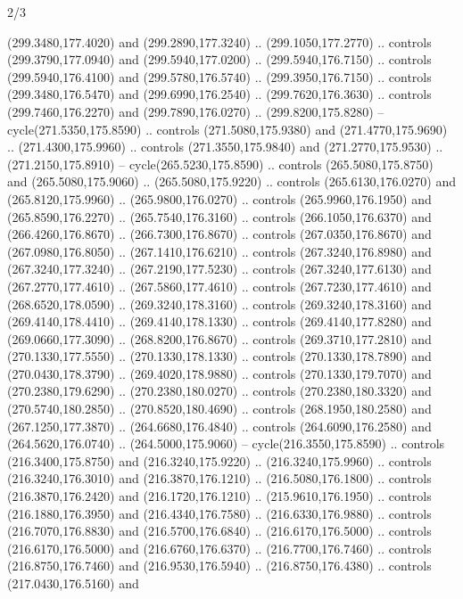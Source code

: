 \begin{flagdescription}{2/3}
\begin{scope}[xshift=0.5\flaglength,yshift=0.5\flagwidth,scale=\flagwidth/259.2]
\begin{scope}[y=0.8pt, x=0.8pt, yscale=-1,shift={(-243,-162)}]
      (299.3480,177.4020) and (299.2890,177.3240) .. (299.1050,177.2770) .. controls
      (299.3790,177.0940) and (299.5940,177.0200) .. (299.5940,176.7150) .. controls
      (299.5940,176.4100) and (299.5780,176.5740) .. (299.3950,176.7150) .. controls
      (299.3480,176.5470) and (299.6990,176.2540) .. (299.7620,176.3630) .. controls
      (299.7460,176.2270) and (299.7890,176.0270) .. (299.8200,175.8280) --
      cycle(271.5350,175.8590) .. controls (271.5080,175.9380) and
      (271.4770,175.9690) .. (271.4300,175.9960) .. controls (271.3550,175.9840) and
      (271.2770,175.9530) .. (271.2150,175.8910) -- cycle(265.5230,175.8590) ..
      controls (265.5080,175.8750) and (265.5080,175.9060) .. (265.5080,175.9220) ..
      controls (265.6130,176.0270) and (265.8120,175.9960) .. (265.9800,176.0270) ..
      controls (265.9960,176.1950) and (265.8590,176.2270) .. (265.7540,176.3160) ..
      controls (266.1050,176.6370) and (266.4260,176.8670) .. (266.7300,176.8670) ..
      controls (267.0350,176.8670) and (267.0980,176.8050) .. (267.1410,176.6210) ..
      controls (267.3240,176.8980) and (267.3240,177.3240) .. (267.2190,177.5230) ..
      controls (267.3240,177.6130) and (267.2770,177.4610) .. (267.5860,177.4610) ..
      controls (267.7230,177.4610) and (268.6520,178.0590) .. (269.3240,178.3160) ..
      controls (269.3240,178.3160) and (269.4140,178.4410) .. (269.4140,178.1330) ..
      controls (269.4140,177.8280) and (269.0660,177.3090) .. (268.8200,176.8670) ..
      controls (269.3710,177.2810) and (270.1330,177.5550) .. (270.1330,178.1330) ..
      controls (270.1330,178.7890) and (270.0430,178.3790) .. (269.4020,178.9880) ..
      controls (270.1330,179.7070) and (270.2380,179.6290) .. (270.2380,180.0270) ..
      controls (270.2380,180.3320) and (270.5740,180.2850) .. (270.8520,180.4690) ..
      controls (268.1950,180.2580) and (267.1250,177.3870) .. (264.6680,176.4840) ..
      controls (264.6090,176.2580) and (264.5620,176.0740) .. (264.5000,175.9060) --
      cycle(216.3550,175.8590) .. controls (216.3400,175.8750) and
      (216.3240,175.9220) .. (216.3240,175.9960) .. controls (216.3240,176.3010) and
      (216.3870,176.1210) .. (216.5080,176.1800) .. controls (216.3870,176.2420) and
      (216.1720,176.1210) .. (215.9610,176.1950) .. controls (216.1880,176.3950) and
      (216.4340,176.7580) .. (216.6330,176.9880) .. controls (216.7070,176.8830) and
      (216.5700,176.6840) .. (216.6170,176.5000) .. controls (216.6170,176.5000) and
      (216.6760,176.6370) .. (216.7700,176.7460) .. controls (216.8750,176.7460) and
      (216.9530,176.5940) .. (216.8750,176.4380) .. controls (217.0430,176.5160) and

\end{scope}
\end{scope}
\end{flagdescription}
